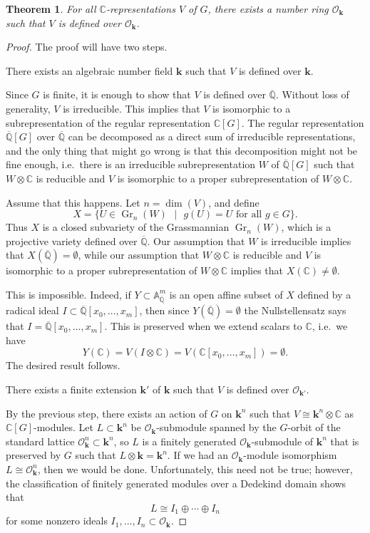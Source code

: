 \documentclass[11pt]{article}
\newenvironment{step}[1]
 {\renewcommand\thestepx{#1}\stepx}
 {\endstepx}
\numberwithin{equation}{section}
\theoremstyle{plain}
\newtheorem{maintheorem}{Theorem}
\theoremstyle{definition}
\DeclareMathOperator{\Gr}{Gr}
\newcommand\C{\ensuremath{\mathbb{C}}}
\newcommand\Q{\ensuremath{\mathbb{Q}}}
\newcommand\Set[2]{\ensuremath{\{\text{#1 $|$ #2}\}}}
\newcommand\bk{\ensuremath{\mathbf{k}}}
\newcommand\cO{\ensuremath{\mathcal{O}}}
\newcommand\oQ{\ensuremath{\overline{\Q}}}
\newcommand\bbA{\ensuremath{\mathbb{A}}}
\begin{document}
\begin{maintheorem}
\label{theorem:algebraicnumber}
For all $\C$-representations $V$ of $G$, there exists a number ring
$\cO_{\bk}$ such that $V$ is defined over $\cO_{\bk}$.
\end{maintheorem}
\begin{proof}
The proof will have two steps.

\begin{step}{1}
There exists an algebraic number field $\bk$ such that $V$ is defined
over $\bk$.
\end{step}

Since $G$ is finite, it is enough to show that $V$ is defined over $\oQ$.
Without loss of generality, $V$ is irreducible.  This implies that
$V$ is isomorphic to a subrepresentation of the regular representation $\C[G]$.
The regular representation $\oQ[G]$ over $\oQ$ can be decomposed as a direct
sum of irreducible representations, and the only thing that might go wrong
is that this decomposition might not be fine enough, i.e.\
there is an irreducible subrepresentation $W$ of $\oQ[G]$ such that
$W \otimes \C$ is reducible and $V$ is isomorphic to a proper
subrepresentation of $W \otimes \C$.

Assume that this happens.  Let $n = \dim(V)$, and define
\[X = \Set{$U \in \Gr_n(W)$}{$g(U) = U$ for all $g \in G$}.\]
Thus $X$ is a closed subvariety of the Grassmannian $\Gr_n(W)$, which is a projective variety
defined over $\oQ$.  Our assumption that $W$ is irreducible implies
that $X(\oQ) = \emptyset$, while our assumption that $W \otimes \C$ is reducible
and $V$ is isomorphic to a proper subrepresentation of $W \otimes \C$ implies
that $X(\C) \neq \emptyset$.

This is impossible.  Indeed, if $Y \subset \bbA^m_{\oQ}$ is an open affine
subset of $X$ defined by a radical ideal $I \subset \oQ[x_0,\ldots,x_m]$, then 
since $Y(\oQ) = \emptyset$ the
Nullstellensatz says that $I = \oQ[x_0,\ldots,x_m]$.  This is preserved when we
extend scalars to $\C$, i.e.\ we have
\[Y(\C) = V(I \otimes \C) = V(\C[x_0,\ldots,x_m]) = \emptyset.\]
The desired result follows.

\begin{step}{2}
There exists a finite extension $\bk'$ of $\bk$ such that $V$ is defined
over $\cO_{\bk'}$.
\end{step}

By the previous step, there exists an action of $G$ on $\bk^n$ such that
$V \cong \bk^n \otimes \C$ as $\C[G]$-modules.  Let $L \subset \bk^n$ be
$\cO_{\bk}$-submodule spanned by the $G$-orbit of the standard lattice
$\cO_{\bk}^n \subset \bk^n$, so $L$ is a finitely generated $\cO_{\bk}$-submodule
of $\bk^n$ that is preserved by $G$ 
such that $L \otimes \bk = \bk^n$.  If we had an $\cO_{\bk}$-module isomorphism
$L \cong \cO_{\bk}^n$, then we would be done.  Unfortunately, this need not be true;
however, the classification of finitely generated modules over a Dedekind domain
shows that
\[L \cong I_1 \oplus \cdots \oplus I_n\]
for some nonzero ideals $I_1,\ldots,I_n  \subset \cO_{\bk}$.


\end{proof}
\end{document}
